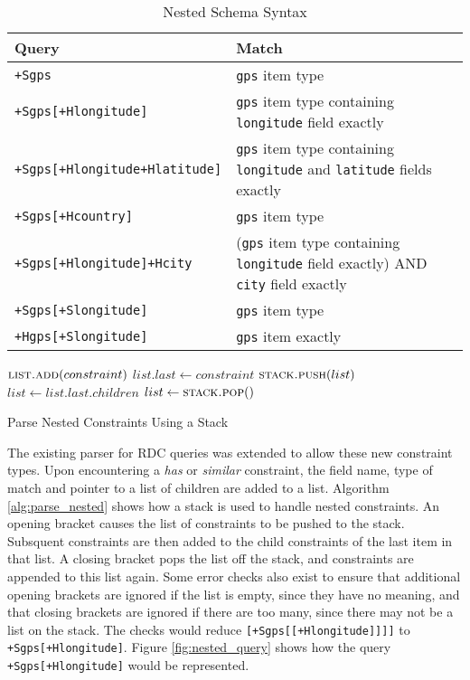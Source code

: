 \documentclass[12pt,twoside,notitlepage]{report}
\begin{document}
\begin{table}
\centering

\begin{tabular}{l p{8cm}}
\hline\hline
Query & Match \\
\hline

{\tt +Sgps}							& {\tt gps} item type \\
{\tt +Sgps[+Hlongitude]}			& {\tt gps} item type containing {\tt longitude} field exactly \\
{\tt +Sgps[+Hlongitude+Hlatitude]}	& {\tt gps} item type containing {\tt longitude} and {\tt latitude} fields exactly \\

{\tt +Sgps[+Hcountry]}				& {\tt gps} item type \\

{\tt +Sgps[+Hlongitude]+Hcity}		& ({\tt gps} item type containing {\tt longitude} field exactly) AND {\tt city} field exactly \\

{\tt +Sgps[+Slongitude]}			& {\tt gps} item type \\
{\tt +Hgps[+Slongitude]}			& {\tt gps} item exactly \\

\hline
\end{tabular}

\caption{Nested Schema Syntax}
\label{tab:nested_schema_syntax}
\end{table}

\begin{algorithm}
\begin{algorithmic}[1]
		\State $\Call{list.add}{constraint}$
		\State $list.last \gets constraint$
	\Else
			\State $\Call{stack.push}{list}$
			\State $list \gets list.last.children$
			\State $list \gets \Call{stack.pop}$
		\EndIf
	\EndIf
\EndWhile
\end{algorithmic}
\caption{Parse Nested Constraints Using a Stack}
\label{alg:parse_nested}
\end{algorithm} 

The existing parser for RDC queries was extended to allow these new constraint types. 
Upon encountering a {\sl has} or {\sl similar} constraint, the field name, type of match and pointer to a list of children are added to a list. 
Algorithm \ref{alg:parse_nested} shows how a stack is used to handle nested constraints. 
An opening bracket causes the list of constraints to be pushed to the stack.
Subsquent constraints are then added to the child constraints of the last item in that list. 
A closing bracket pops the list off the stack, and constraints are appended to this list again. 
Some error checks also exist to ensure that additional opening brackets are ignored if the list is empty, since they have no meaning, and that closing brackets are ignored if there are too many, since there may not be a list on the stack. 
The checks would reduce {\tt [+Sgps[[+Hlongitude]]]]} to {\tt +Sgps[+Hlongitude]}.
Figure \ref{fig:nested_query} shows how the query {\tt +Sgps[+Hlongitude]} would be represented.
\end{document}
